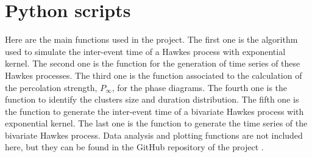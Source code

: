 \chapter{Python scripts}\label{ch:Anexo}
Here are the main functions used in the project. The first one is the algorithm used to simulate the inter-event time of a Hawkes process with exponential kernel. 
The second one is the function for the generation of time series of these Hawkes processes. The third one is the function associated to the calculation of the percolation strength, $P_\infty$,
for the phase diagrams. The fourth one is the function to identify the clusters size and duration distribution. The fifth one is the function to generate the inter-event time of a 
bivariate Hawkes process with exponential kernel. The last one is the function to generate the time series of the bivariate Hawkes process. Data analysis and plotting functions are not included
here, but they can be found in the GitHub repository of the project \cite{github}.


